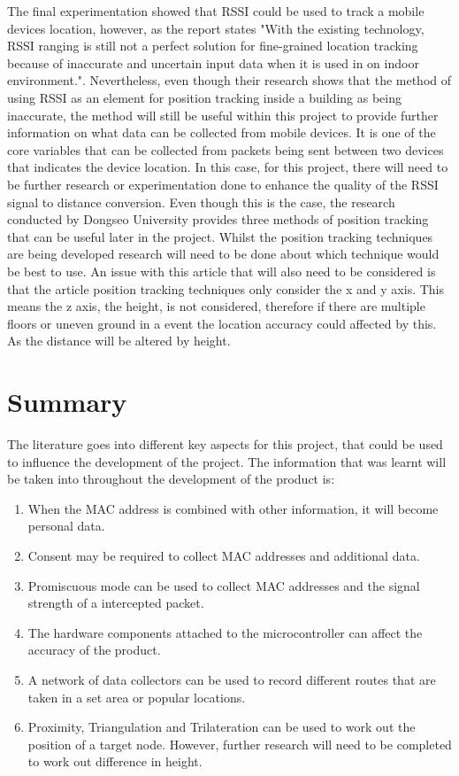 \documentclass{report}
\begin{document}
The final experimentation showed that RSSI could be used to track a mobile devices location, however, as the report states "With the existing technology, RSSI ranging is still not a perfect solution for fine-grained location tracking because of inaccurate and uncertain input data when it is used in on indoor environment."\cite{IndoorTrackingRSSI}. Nevertheless, even though their research shows that the method of using RSSI as an element for position tracking inside a building as being inaccurate, the method will still be useful within this project to provide further information on what data can be collected from mobile devices. It is one of the core variables that can be collected from packets being sent between two devices that indicates the device location. In this case, for this project, there will need to be further research or experimentation done to enhance the quality of the RSSI signal to distance conversion. Even though this is the case, the research conducted by Dongseo University provides three methods of position tracking that can be useful later in the project. Whilst the position tracking techniques are being developed research will need to be done about which technique would be best to use. An issue with this article that will also need to be considered is that the article position tracking techniques only consider the x and y axis. This means the z axis, the height, is not considered, therefore if there are multiple floors or uneven ground in a event the location accuracy could affected by this. As the distance will be altered by height.\\ \newline 

\section{Summary}
The literature goes into different key aspects for this project, that could be used to influence the development of the project. The information that was learnt will be taken into throughout the development of the product is: 
\begin{enumerate}
    \item When the MAC address is combined with other information, it will become personal data.
    \item Consent may be required to collect MAC addresses and additional data.
    \item Promiscuous mode\cite{Promiscuous_mode} can be used to collect MAC addresses and the signal strength of a intercepted packet.
    \item The hardware components attached to the microcontroller can affect the accuracy of the product.
    \item A network of data collectors can be used to record different routes that are taken in a set area or popular locations.
    \item Proximity, Triangulation and Trilateration can be used to work out the position of a target node. However, further research will need to be completed to work out difference in height.
\end{enumerate}
\end{document}
